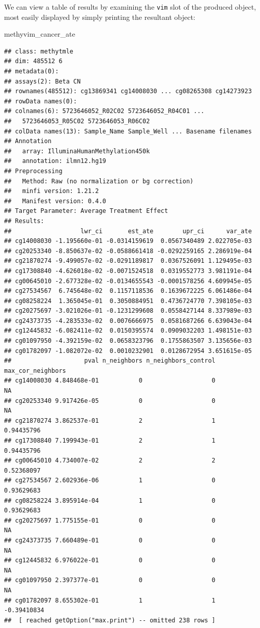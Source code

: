\documentclass[9pt,a4paper,]{extarticle}
\newenvironment{Shaded}{\begin{snugshade}}{\end{snugshade}}
\newcommand{\NormalTok}[1]{#1}
\theoremstyle{definition}
\theoremstyle{definition}
\theoremstyle{definition}
\theoremstyle{remark}
\begin{document}
We can view a table of results by examining the \texttt{vim} slot of the produced
object, most easily displayed by simply printing the resultant object:

\begin{Shaded}
\begin{Highlighting}[]
\NormalTok{methyvim_cancer_ate}
\end{Highlighting}
\end{Shaded}

\begin{verbatim}
## class: methytmle 
## dim: 485512 6 
## metadata(0):
## assays(2): Beta CN
## rownames(485512): cg13869341 cg14008030 ... cg08265308 cg14273923
## rowData names(0):
## colnames(6): 5723646052_R02C02 5723646052_R04C01 ...
##   5723646053_R05C02 5723646053_R06C02
## colData names(13): Sample_Name Sample_Well ... Basename filenames
## Annotation
##   array: IlluminaHumanMethylation450k
##   annotation: ilmn12.hg19
## Preprocessing
##   Method: Raw (no normalization or bg correction)
##   minfi version: 1.21.2
##   Manifest version: 0.4.0
## Target Parameter: Average Treatment Effect
## Results: 
##                   lwr_ci       est_ate        upr_ci      var_ate
## cg14008030 -1.195660e-01 -0.0314159619  0.0567340489 2.022705e-03
## cg20253340 -8.850637e-02 -0.0588661418 -0.0292259165 2.286919e-04
## cg21870274 -9.499057e-02 -0.0291189817  0.0367526091 1.129495e-03
## cg17308840 -4.626018e-02 -0.0071524518  0.0319552773 3.981191e-04
## cg00645010 -2.677328e-02 -0.0134655543 -0.0001578256 4.609945e-05
## cg27534567  6.745648e-02  0.1157118536  0.1639672225 6.061486e-04
## cg08258224  1.365045e-01  0.3050884951  0.4736724770 7.398105e-03
## cg20275697 -3.021026e-01 -0.1231299608  0.0558427144 8.337989e-03
## cg24373735 -4.283533e-02  0.0076666975  0.0581687266 6.639043e-04
## cg12445832 -6.082411e-02  0.0150395574  0.0909032203 1.498151e-03
## cg01097950 -4.392159e-02  0.0658323796  0.1755863507 3.135656e-03
## cg01782097 -1.082072e-02  0.0010232901  0.0128672954 3.651615e-05
##                    pval n_neighbors n_neighbors_control max_cor_neighbors
## cg14008030 4.848468e-01           0                   0                NA
## cg20253340 9.917426e-05           0                   0                NA
## cg21870274 3.862537e-01           2                   1        0.94435796
## cg17308840 7.199943e-01           2                   1        0.94435796
## cg00645010 4.734007e-02           2                   2        0.52368097
## cg27534567 2.602936e-06           1                   0        0.93629683
## cg08258224 3.895914e-04           1                   0        0.93629683
## cg20275697 1.775155e-01           0                   0                NA
## cg24373735 7.660489e-01           0                   0                NA
## cg12445832 6.976022e-01           0                   0                NA
## cg01097950 2.397377e-01           0                   0                NA
## cg01782097 8.655302e-01           1                   1       -0.39410834
##  [ reached getOption("max.print") -- omitted 238 rows ]
\end{verbatim}
\end{document}
